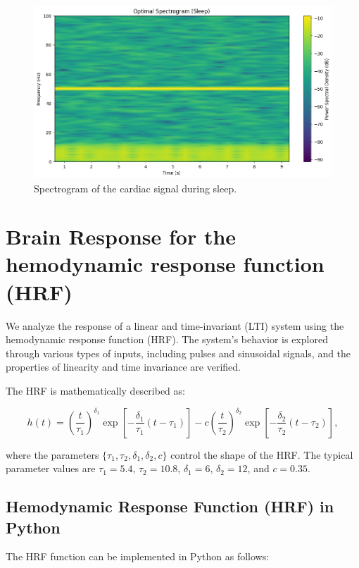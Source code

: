 \documentclass[10pt]{article}
\theoremstyle{definition}
\theoremstyle{remark}
\theoremstyle{definition}
\numberwithin{equation}{prob}
\begin{document}
\begin{figure}[h]
    \centering
    \includegraphics[width=0.8\linewidth]{./figures/Optimal Spectrogram Sleep.png}
    \caption{Spectrogram of the cardiac signal during sleep.}
\end{figure}


\section{Brain Response for the hemodynamic response function (HRF)}

We analyze the response of a linear and time-invariant (LTI) system using the hemodynamic response function (HRF). The system’s behavior is explored through various types of inputs, including pulses and sinusoidal signals, and the properties of linearity and time invariance are verified.

The HRF is mathematically described as:

\begin{equation}
h(t) = \left( \frac{t}{\tau_1} \right)^{\delta_1} \exp\left[ -\frac{\delta_1}{\tau_1} (t-\tau_1) \right] - c \left( \frac{t}{\tau_2} \right)^{\delta_2} \exp\left[ -\frac{\delta_2}{\tau_2} (t-\tau_2) \right],
\end{equation}

where the parameters $\{\tau_1,\tau_2,\delta_1,\delta_2,c\}$ control the shape of the HRF. The typical parameter values are $\tau_1=5.4$, $\tau_2=10.8$, $\delta_1=6$, $\delta_2=12$, and $c=0.35$.

\subsection{Hemodynamic Response Function (HRF) in Python}

The HRF function can be implemented in Python as follows:
\end{document}
